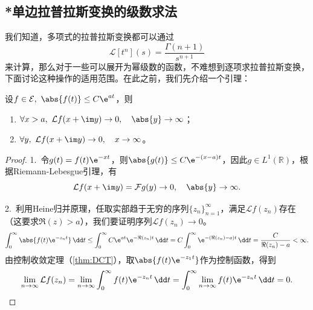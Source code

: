 \subsection{*单边拉普拉斯变换的级数求法}\label{sub:laplace_by_series}
我们知道，多项式的拉普拉斯变换都可以通过
\begin{equation}
    \mathcal{L}[t^n](s)=\frac{\Gamma(n+1)}{s^{n+1}}
\end{equation}
来计算，那么对于一些可以展开为幂级数的函数，不难想到逐项求拉普拉斯变换，下面讨论这种操作的适用范围。在此之前，我们先介绍一个引理：
\begin{lemma}
    设$f\in\mathcal{E},\ \abs{f(t)}\leq C\e^{at}$，则
    \begin{enumerate}
        \item $\forall x>a,\ \mathcal{L}f(x+\im y)\to 0,\quad \abs{y}\to\infty$；
        \item $\forall y,\ \mathcal{L}f(x+\im y)\to 0,\quad x\to\infty$。
    \end{enumerate}
\end{lemma}
\begin{proof}
    1.\ 令$g(t)=f(t)\e^{-xt}$，则$\abs{g(t)}\leq C\e^{-(x-a)t}$，因此$g\in L^1(\mathbb{R})$，根据Riemann-Lebesgue引理，有
    \begin{equation}
        \mathcal{L}f(x+\im y)=\mathcal{F}g(y)\to 0,\quad \abs{y}\to\infty.
    \end{equation}

    2.\ 利用Heine归并原理，任取实部趋于无穷的序列$\{z_n\}_{n=1}^\infty$，满足$\mathcal{L}f(z_n)$存在（这要求$\Re(z)>a$），我们要证明序列$\mathcal{L}f(z_n)\to 0$。
    \begin{equation}
        \int_{0}^{\infty}\abs{f(t)\e^{-z_n t}}\,\dd t\leq \int_0^{\infty}C\e^{at}\e^{-\Re(z_n)t}\,\dd t=C\int_0^{\infty}\e^{-(\Re(z_n)-a)t}\,\dd t=\frac{C}{\Re(z_n)-a}<\infty.
    \end{equation}
    由控制收敛定理（\cref{thm:DCT}），取$\abs{f(t)\e^{-z_1 t}}$作为控制函数，得到
    \begin{equation}
        \lim_{n\to\infty}\mathcal{L}f(z_n)=\lim_{n\to\infty}\int_0^{\infty}f(t)\e^{-z_n t}\,\dd t=\int_0^{\infty}\lim_{n\to\infty}f(t)\e^{-z_n t}\,\dd t=0.
    \end{equation}
\end{proof}

